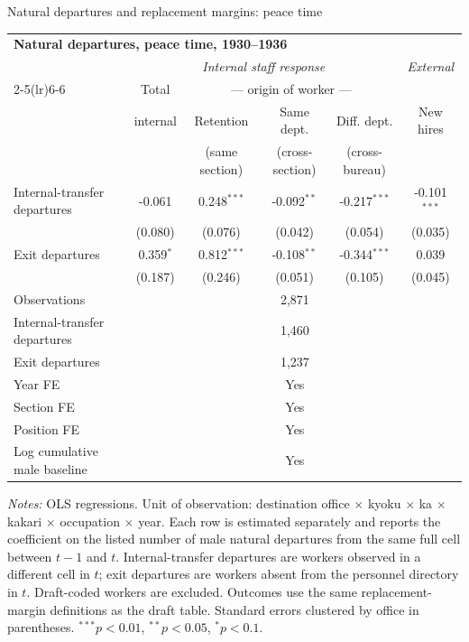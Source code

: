 \begin{frame}[t]{Natural departures and replacement margins: peace time}
    \tiny
    \centering
    \begin{threeparttable}
    \begin{tabular}{lcccc|c}
        \toprule
        \multicolumn{6}{l}{\textbf{Natural departures, peace time, 1930--1936}} \\[2pt]
        & \multicolumn{4}{c|}{\textit{Internal staff response}} & \textit{External} \\
        \cmidrule(lr){2-5}\cmidrule(lr){6-6}
         & Total & \multicolumn{3}{c|}{--- origin of worker ---} & \\
         & internal & Retention & Same dept. & Diff. dept. & New hires \\
         &  & (same section) & (cross-section) & (cross-bureau) & \\
        \midrule
        Internal-transfer departures & -0.061 & 0.248$^{***}$ & -0.092$^{**}$ & -0.217$^{***}$ & -0.101$^{***}$ \\
         & (0.080) & (0.076) & (0.042) & (0.054) & (0.035) \\
        Exit departures & 0.359$^{*}$ & 0.812$^{***}$ & -0.108$^{**}$ & -0.344$^{***}$ & 0.039 \\
         & (0.187) & (0.246) & (0.051) & (0.105) & (0.045) \\
        \midrule
        Observations & \multicolumn{5}{c}{2,871} \\
        Internal-transfer departures & \multicolumn{5}{c}{1,460} \\
        Exit departures & \multicolumn{5}{c}{1,237} \\
        Year FE & \multicolumn{5}{c}{Yes} \\
        Section FE & \multicolumn{5}{c}{Yes} \\
        Position FE & \multicolumn{5}{c}{Yes} \\
        Log cumulative male baseline & \multicolumn{5}{c}{Yes} \\
        \bottomrule
    \end{tabular}
    \begin{tablenotes}[flushleft]
        \tiny
        \item \textit{Notes:} OLS regressions. Unit of observation: destination office $\times$ kyoku $\times$ ka $\times$ kakari $\times$ occupation $\times$ year. Each row is estimated separately and reports the coefficient on the listed number of male natural departures from the same full cell between $t-1$ and $t$. Internal-transfer departures are workers observed in a different cell in $t$; exit departures are workers absent from the personnel directory in $t$. Draft-coded workers are excluded. Outcomes use the same replacement-margin definitions as the draft table. Standard errors clustered by office in parentheses. $^{***}p<0.01$, $^{**}p<0.05$, $^{*}p<0.1$.
    \end{tablenotes}
    \end{threeparttable}
\end{frame}

